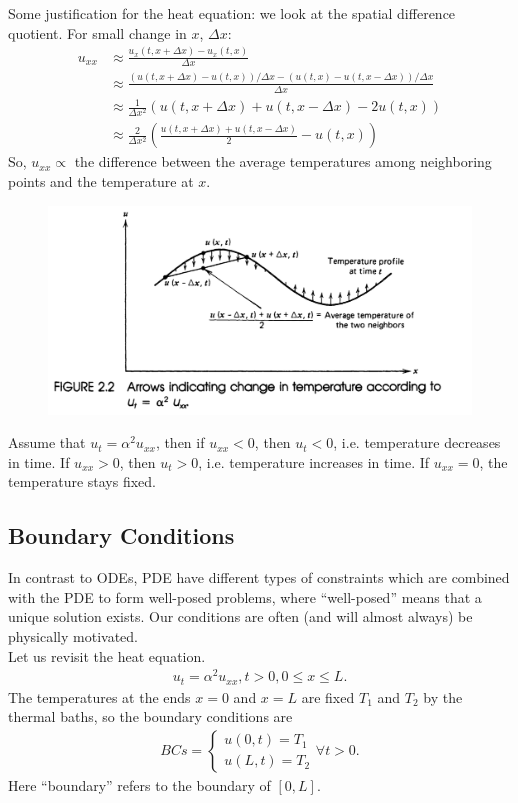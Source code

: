 \documentclass{article}
\theoremstyle{definition}
\begin{document}
Some justification for the heat equation: we look at the spatial difference quotient. For small change in $x$, $\Delta x$:
\begin{align*}
u_{xx} &\approx \frac{u_x(t,x+\Delta x) - u_x(t,x)}{\Delta x}\\
&\approx \frac{(u(t,x+\Delta x) - u(t,x))/\Delta x - (u(t,x)-u(t,x-\Delta x))/\Delta x}{\Delta x}\\
&\approx \frac{1}{\Delta x^2}(u(t,x+\Delta x) + u(t,x-\Delta x) - 2u(t,x))\\
&\approx \frac{2}{\Delta x^2}\left(\frac{u(t,x+\Delta x) + u(t,x-\Delta x)}{2} - u(t,x) \right)
\end{align*}
So, $u_{xx} \propto$ the difference between the average temperatures among neighboring points and the temperature at $x$. 
\begin{figure}[h!]
	\centering
	\includegraphics[scale=0.5]{copper1.png}
\end{figure}

Assume that $u_t = \alpha^2 u_{xx}$, then if $u_{xx} < 0$, then $u_t < 0$, i.e. temperature decreases in time. If $u_{xx} > 0$, then $u_t > 0$, i.e. temperature increases in time. If $u_{xx} = 0$, the temperature stays fixed. 

\subsection{Boundary Conditions}
In contrast to ODEs, PDE have different types of constraints which are combined with the PDE to form well-posed problems, where ``well-posed'' means that a unique solution exists. Our conditions are often (and will almost always) be physically motivated. \\

Let us revisit the heat equation. 
\begin{align*}
u_t = \alpha^2 u_{xx}, t> 0, 0\leq x\leq L.
\end{align*}
The temperatures at the ends $x=0$ and $x=L$ are fixed $T_1$ and $T_2$ by the thermal baths, so the boundary conditions are
\begin{align*}
BCs = \begin{cases*}
u(0,t) = T_1\\
u(L,t) = T_2
\end{cases*}
\forall t > 0.
\end{align*} 
Here ``boundary'' refers to the boundary of $[0,L]$.
\end{document}
